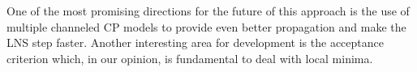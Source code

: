 \documentclass{llncs}
\begin{document}
One of the most promising directions for the future of this approach is the use of multiple channeled CP models to provide even better propagation and make the LNS step faster. Another interesting area for development is the acceptance criterion which, in our opinion, is fundamental to deal with local minima.

\vspace{-0.2cm}

\begin{footnotesize}


\end{footnotesize}
\end{document}
